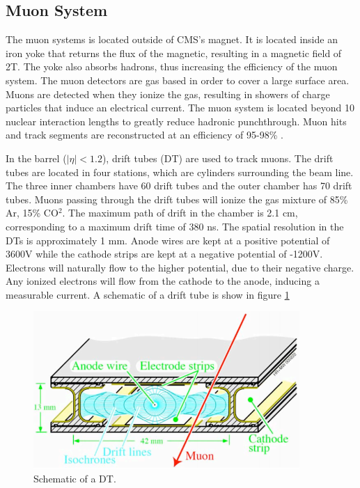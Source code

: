\documentclass[oneside, letterpaper, oldfontcommands]{memoir}
\begin{document}
\subsection{Muon System}\label{muonsys}
\qquad The muon systems is located outside of CMS's magnet. It is located inside an iron yoke that returns the flux of the magnetic, resulting in a magnetic field of 2T. The yoke also absorbs hadrons, thus increasing the efficiency of the muon system. The muon detectors are gas based in order to cover a large surface area. Muons are detected when they ionize the gas, resulting in showers of charge particles that induce an electrical current. The muon system is located beyond 10 nuclear interaction lengths to greatly reduce hadronic punchthrough. Muon hits and track segments are reconstructed at an efficiency of 95-98\% \cite{Chatrchyan:2013sba}.

\qquad In the barrel ($|\eta| < 1.2$), drift tubes (DT) are used to track muons. The drift tubes are located in four stations, which are cylinders surrounding the beam line. The three inner chambers have 60 drift tubes and the outer chamber has 70 drift tubes. Muons passing through the drift tubes will ionize the gas mixture of 85\% Ar, 15\% CO$^{2}$. The maximum path of drift in the chamber is 2.1 cm, corresponding to a maximum drift time of 380 ns. The spatial resolution in the DTs is approximately 1 mm\cite{Chatrchyan:2013sba}. Anode wires are kept at a positive potential of 3600V while the cathode strips are kept at a negative potential of -1200V. Electrons will naturally flow to the higher potential, due to their negative charge. Any ionized electrons will flow from the cathode to the anode, inducing a measurable current. A schematic of a drift tube is show in figure \ref{fig:drift_tube}

\begin{figure}[here]
\includegraphics[width=0.9\textwidth]{drift_tube.png}
\caption{Schematic of a DT\cite{1748-0221-3-08-S08001}.}
\label{fig:drift_tube}
\end{figure}
\end{document}
